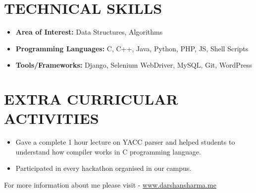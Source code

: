 \documentclass[line, margin, 12pt]{res}
\begin{document}
\begin{resume}
\section{TECHNICAL SKILLS}
\begin{itemize}
\item \textbf{Area of Interest:} Data Structures, Algorithms
\item \textbf{Programming Languages:} C, C++, Java, Python, PHP, JS, Shell Scripts
\item \textbf{Tools/Frameworks:} Django, Selenium WebDriver, MySQL, Git, WordPress\\
\end{itemize}

\section{EXTRA CURRICULAR ACTIVITIES}
\begin{itemize}
\item Gave a complete 1 hour lecture on YACC parser and helped students to understand how
compiler works in C programming language.
\item Participated in every hackathon organised in our campus.\\
\end{itemize}

For more information about me please visit - \href{https://www.darshansharma.me}{www.darshansharma.me}
\end{resume}
\end{document}

